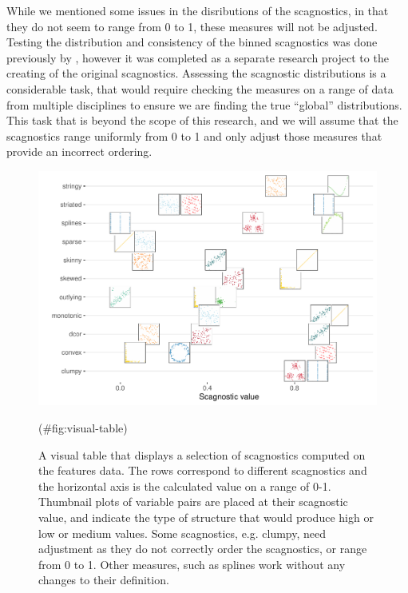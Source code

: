 While we mentioned some issues in the disributions of the scagnostics,
in that they do not seem to range from 0 to 1, these measures will not
be adjusted. Testing the distribution and consistency of the binned
scagnostics was done previously by \citet{scagdist}, however it was
completed as a separate research project to the creating of the original
scagnostics. Assessing the scagnostic distributions is a considerable
task, that would require checking the measures on a range of data from
multiple disciplines to ensure we are finding the true ``global''
distributions. This task that is beyond the scope of this research, and
we will assume that the scagnostics range uniformly from 0 to 1 and only
adjust those measures that provide an incorrect ordering.

\begin{Schunk}
\begin{figure}
\includegraphics[width=1\linewidth]{mason-lee-laa-cook_files/figure-latex/visual-table-1} \caption[A visual table that displays a selection of scagnostics computed on the features data]{A visual table that displays a selection of scagnostics computed on the features data. The rows correspond to different scagnostics and the horizontal axis is the calculated value on a range of 0-1. Thumbnail plots of variable pairs are placed at their scagnostic value, and indicate the type of structure that would produce high or low or medium values. Some scagnostics, e.g. clumpy, need adjustment as they do not correctly order the scagnostics, or range from 0 to 1. Other measures, such as splines work without any changes to their definition.}(\#fig:visual-table)
\end{figure}
\end{Schunk}

